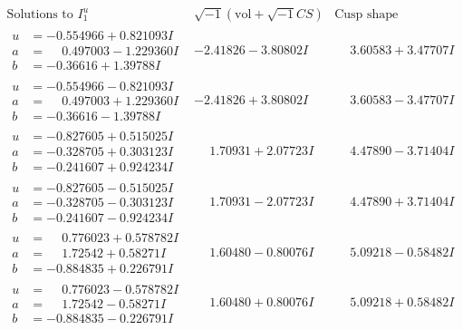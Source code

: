 \documentclass[1p]{elsarticle_modified}
\theoremstyle{definition}
\newcommand{\I}{\sqrt{-1}}
\begin{document}
$$\begin{array}{c|c|c}  
\text{Solutions to }I^u_{1}& \I (\text{vol} + \sqrt{-1}CS) & \text{Cusp shape}\\
 \hline 
\begin{aligned}
u &= -0.554966 + 0.821093 I \\
a &= \phantom{-}0.497003 - 1.229360 I \\
b &= -0.36616 + 1.39788 I\end{aligned}
 & -2.41826 - 3.80802 I & \phantom{-}3.60583 + 3.47707 I \\ \hline\begin{aligned}
u &= -0.554966 - 0.821093 I \\
a &= \phantom{-}0.497003 + 1.229360 I \\
b &= -0.36616 - 1.39788 I\end{aligned}
 & -2.41826 + 3.80802 I & \phantom{-}3.60583 - 3.47707 I \\ \hline\begin{aligned}
u &= -0.827605 + 0.515025 I \\
a &= -0.328705 + 0.303123 I \\
b &= -0.241607 + 0.924234 I\end{aligned}
 & \phantom{-}1.70931 + 2.07723 I & \phantom{-}4.47890 - 3.71404 I \\ \hline\begin{aligned}
u &= -0.827605 - 0.515025 I \\
a &= -0.328705 - 0.303123 I \\
b &= -0.241607 - 0.924234 I\end{aligned}
 & \phantom{-}1.70931 - 2.07723 I & \phantom{-}4.47890 + 3.71404 I \\ \hline\begin{aligned}
u &= \phantom{-}0.776023 + 0.578782 I \\
a &= \phantom{-}1.72542 + 0.58271 I \\
b &= -0.884835 + 0.226791 I\end{aligned}
 & \phantom{-}1.60480 - 0.80076 I & \phantom{-}5.09218 - 0.58482 I \\ \hline\begin{aligned}
u &= \phantom{-}0.776023 - 0.578782 I \\
a &= \phantom{-}1.72542 - 0.58271 I \\
b &= -0.884835 - 0.226791 I\end{aligned}
 & \phantom{-}1.60480 + 0.80076 I & \phantom{-}5.09218 + 0.58482 I \\ \hline\begin{aligned}

\end{aligned}
\end{array}$$
\end{document}
